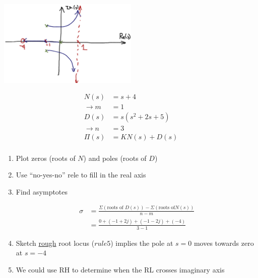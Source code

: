 \begin{enumerate}
\begin{enumerate}
\begin{itemize}
                        \begin{center}\includegraphics[width=0.5\textwidth,keepaspectratio]{images/6-2-c.png}\end{center}
                        \begin{align*}
                            N(s) &= s + 4 \\
                            \rightarrow m &= 1 \\
                            D(s) &= s(s^2 + 2s + 5) \\
                            \rightarrow n &= 3 \\
                            \Pi(s) &= KN(s) + D(s) \\
                        \end{align*}

                        \begin{enumerate}
                            \item Plot zeros (roots of $N$) and poles (roots of $D$)
                            \item Use ``no-yes-no'' rele to fill in the real axis
                            \item Find asymptotes

                                \begin{align*}
                                    \sigma &= \frac{\Sigma{(\text{roots of }D(s))} - \Sigma{(\text{roots of} N(s))}}{n-m} \\
                                    &= \frac{0 + (-1+2j) + (-1-2j) + (-4)}{3-1}
                                \end{align*}

                            \item Sketch \uline{rough} root locus ($rule 5$) implies the pole at $s = 0$ moves towards zero at $s = -4$
                            \item We could use RH to determine when the RL crosses imaginary axis
                        \end{enumerate}


\end{itemize}
\end{enumerate}
\end{enumerate}
